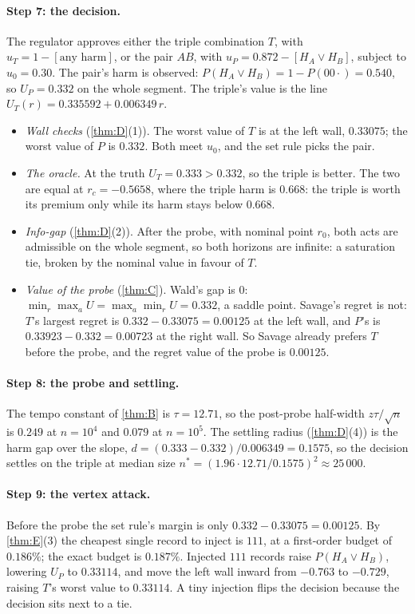 \documentclass[11pt]{article}
\theoremstyle{definition}\newtheorem{definition}{Definition}\newtheorem{remark}{Remark}
\begin{document}
\paragraph{Step 7: the decision.} The regulator approves either the triple combination $T$, with $u_T=1-[\text{any harm}]$, or the pair
$AB$, with $u_P=0.872-[H_A\vee H_B]$, subject to $u_0=0.30$. The pair's harm is observed: $P(H_A\vee H_B)=1-P(00\cdot)=0.540$, so
$U_P=0.332$ on the whole segment. The triple's value is the line $U_T(r)=0.335592+0.006349\,r$.
\begin{itemize}
\item \emph{Wall checks} (\cref{thm:D}(1)). The worst value of $T$ is at the left wall, $0.33075$; the worst value of $P$ is $0.332$. Both
  meet $u_0$, and the set rule picks the pair.
\item \emph{The oracle.} At the truth $U_T=0.333>0.332$, so the triple is better. The two are equal at $r_c=-0.5658$, where the triple
  harm is $0.668$: the triple is worth its premium only while its harm stays below $0.668$.
\item \emph{Info-gap} (\cref{thm:D}(2)). After the probe, with nominal point $r_0$, both acts are admissible on the whole segment, so both
  horizons are infinite: a saturation tie, broken by the nominal value in favour of $T$.
\item \emph{Value of the probe} (\cref{thm:C}). Wald's gap is $0$: $\min_r\max_aU=\max_a\min_rU=0.332$, a saddle point. Savage's regret
  is not: $T$'s largest regret is $0.332-0.33075=0.00125$ at the left wall, and $P$'s is $0.33923-0.332=0.00723$ at the right wall. So
  Savage already prefers $T$ before the probe, and the regret value of the probe is $0.00125$.
\end{itemize}

\paragraph{Step 8: the probe and settling.} The tempo constant of \cref{thm:B} is $\tau=12.71$, so the post-probe half-width
$z\tau/\sqrt n$ is $0.249$ at $n=10^4$ and $0.079$ at $n=10^5$. The settling radius (\cref{thm:D}(4)) is the harm gap over the slope,
$d=(0.333-0.332)/0.006349=0.1575$, so the decision settles on the triple at median size $n^*=(1.96\cdot12.71/0.1575)^2\approx25\,000$.

\paragraph{Step 9: the vertex attack.} Before the probe the set rule's margin is only $0.332-0.33075=0.00125$. By \cref{thm:E}(3) the
cheapest single record to inject is $111$, at a first-order budget of $0.186\%$; the exact budget is $0.187\%$. Injected $111$ records
raise $P(H_A\vee H_B)$, lowering $U_P$ to $0.33114$, and move the left wall inward from $-0.763$ to $-0.729$, raising $T$'s worst value
to $0.33114$. A tiny injection flips the decision because the decision sits next to a tie.
\end{document}
